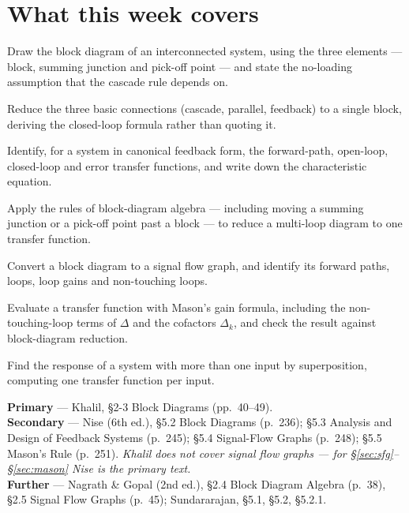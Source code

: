 \documentclass[11pt,a4paper]{article}
\begin{document}
\weektitle

\section*{What this week covers}

\begin{outcomes}
\item Draw the block diagram of an interconnected system, using the three
      elements --- block, summing junction and pick-off point --- and state the
      no-loading assumption that the cascade rule depends on.
\item Reduce the three basic connections (cascade, parallel, feedback) to a
      single block, deriving the closed-loop formula rather than quoting it.
\item Identify, for a system in canonical feedback form, the forward-path,
      open-loop, closed-loop and error transfer functions, and write down the
      characteristic equation.
\item Apply the rules of block-diagram algebra --- including moving a summing
      junction or a pick-off point past a block --- to reduce a multi-loop
      diagram to one transfer function.
\item Convert a block diagram to a signal flow graph, and identify its forward
      paths, loops, loop gains and non-touching loops.
\item Evaluate a transfer function with Mason's gain formula, including the
      non-touching-loop terms of $\Delta$ and the cofactors $\Delta_k$, and
      check the result against block-diagram reduction.
\item Find the response of a system with more than one input by superposition,
      computing one transfer function per input.
\end{outcomes}

\begin{readingbox}
\textbf{Primary} --- Khalil, \S2-3 Block Diagrams (pp.~40--49).\\
\textbf{Secondary} --- Nise (6th ed.), \S5.2 Block Diagrams (p.~236); \S5.3
Analysis and Design of Feedback Systems (p.~245); \S5.4 Signal-Flow Graphs
(p.~248); \S5.5 Mason's Rule (p.~251). \emph{Khalil does not cover signal flow
graphs --- for \S\ref{sec:sfg}--\S\ref{sec:mason} Nise is the primary text.}\\
\textbf{Further} --- Nagrath \& Gopal (2nd ed.), \S2.4 Block Diagram Algebra
(p.~38), \S2.5 Signal Flow Graphs (p.~45); Sundararajan, \S5.1, \S5.2,
\S5.2.1.
\end{readingbox}
\end{document}
